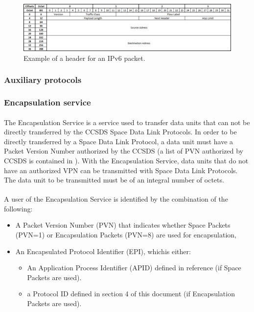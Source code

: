 \begin{figure}[H]
\begin{center}
\includegraphics[scale=0.6]{IPv6_header.PNG}
\caption[IPv6 header]{Example of a header for an IPv6 packet.}
\label{fig:IPv6header}
\end{center}
\end{figure}

\subsubsection{Auxiliary protocols}

\subsubsection*{Encapsulation service\cite{ES}}
\paragraph{}The Encapsulation Service is a service used to transfer data units that can not be directly transferred by the CCSDS Space Data Link Protocols. In order to be directly transferred by a Space Data Link Protocol, a data unit must have a Packet Version Number authorized by the CCSDS (a list of PVN authorized by CCSDS is contained in \cite{SANAPVN}). With the Encapsulation Service, data units that do not have an authorized VPN can be transmitted with Space Data Link Protocols. The data unit to be transmitted must be of an integral number of octets.
\paragraph{}A user of the Encapsulation Service is identified by the combination of the following:
\begin{itemize}
\item A Packet Version Number (PVN) that indicates whether Space Packets (PVN=1) or Encapsulation Packets (PVN=8) are used for encapsulation,
\item An Encapsulated Protocol Identifier (EPI), whichis either:
\begin{itemize}
\item An Application Process Identifier (APID) defined in reference (if Space Packets are used).
\item a Protocol ID defined in section 4 of this document (if Encapsulation Packets are used).
\end{itemize}
\end{itemize}
